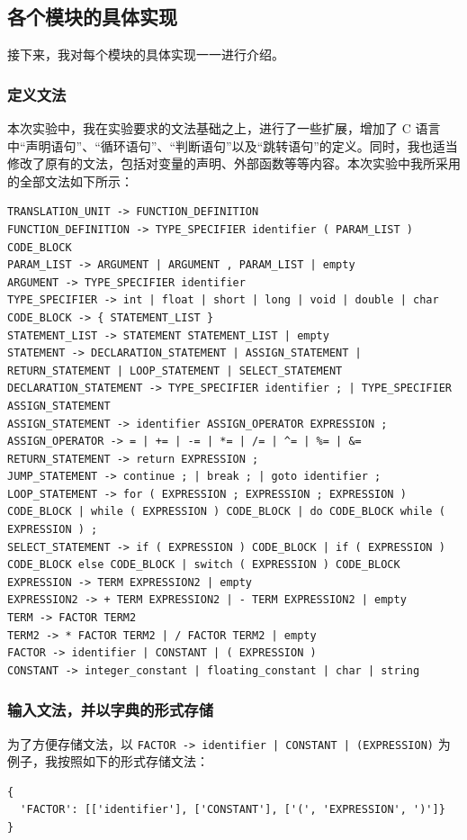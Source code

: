 \documentclass[UTF8]{ctexart}
\begin{document}
\subsection{各个模块的具体实现}
接下来，我对每个模块的具体实现一一进行介绍。

\subsubsection{定义文法}
本次实验中，我在实验要求的文法基础之上，进行了一些扩展，增加了 C 语言中“声明语句”、“循环语句”、“判断语句”以及“跳转语句”的定义。同时，我也适当修改了原有的文法，包括对变量的声明、外部函数等等内容。本次实验中我所采用的全部文法如下所示：

\begin{lstlisting}
TRANSLATION_UNIT -> FUNCTION_DEFINITION
FUNCTION_DEFINITION -> TYPE_SPECIFIER identifier ( PARAM_LIST ) CODE_BLOCK
PARAM_LIST -> ARGUMENT | ARGUMENT , PARAM_LIST | empty
ARGUMENT -> TYPE_SPECIFIER identifier
TYPE_SPECIFIER -> int | float | short | long | void | double | char
CODE_BLOCK -> { STATEMENT_LIST }
STATEMENT_LIST -> STATEMENT STATEMENT_LIST | empty
STATEMENT -> DECLARATION_STATEMENT | ASSIGN_STATEMENT | RETURN_STATEMENT | LOOP_STATEMENT | SELECT_STATEMENT
DECLARATION_STATEMENT -> TYPE_SPECIFIER identifier ; | TYPE_SPECIFIER ASSIGN_STATEMENT
ASSIGN_STATEMENT -> identifier ASSIGN_OPERATOR EXPRESSION ;
ASSIGN_OPERATOR -> = | += | -= | *= | /= | ^= | %= | &=
RETURN_STATEMENT -> return EXPRESSION ;
JUMP_STATEMENT -> continue ; | break ; | goto identifier ;
LOOP_STATEMENT -> for ( EXPRESSION ; EXPRESSION ; EXPRESSION ) CODE_BLOCK | while ( EXPRESSION ) CODE_BLOCK | do CODE_BLOCK while ( EXPRESSION ) ;
SELECT_STATEMENT -> if ( EXPRESSION ) CODE_BLOCK | if ( EXPRESSION ) CODE_BLOCK else CODE_BLOCK | switch ( EXPRESSION ) CODE_BLOCK
EXPRESSION -> TERM EXPRESSION2 | empty
EXPRESSION2 -> + TERM EXPRESSION2 | - TERM EXPRESSION2 | empty
TERM -> FACTOR TERM2
TERM2 -> * FACTOR TERM2 | / FACTOR TERM2 | empty
FACTOR -> identifier | CONSTANT | ( EXPRESSION )
CONSTANT -> integer_constant | floating_constant | char | string
\end{lstlisting}

\subsubsection{输入文法，并以字典的形式存储}
为了方便存储文法，以 \texttt{FACTOR -> identifier | CONSTANT | (EXPRESSION)} 为例子，我按照如下的形式存储文法：

\begin{verbatim}
{
  'FACTOR': [['identifier'], ['CONSTANT'], ['(', 'EXPRESSION', ')']}
}
\end{verbatim}
\end{document}
